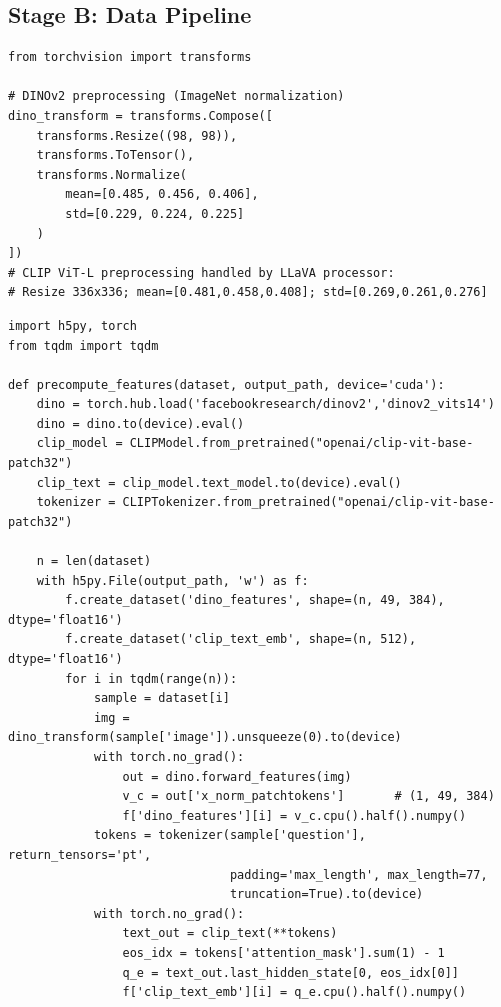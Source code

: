 \documentclass[11pt,a4paper]{article}
\begin{document}
\subsection{Stage B: Data Pipeline}

\begin{lstlisting}[caption={Separate preprocessing for DINOv2 and CLIP.}]
from torchvision import transforms

# DINOv2 preprocessing (ImageNet normalization)
dino_transform = transforms.Compose([
    transforms.Resize((98, 98)),
    transforms.ToTensor(),
    transforms.Normalize(
        mean=[0.485, 0.456, 0.406],
        std=[0.229, 0.224, 0.225]
    )
])
# CLIP ViT-L preprocessing handled by LLaVA processor:
# Resize 336x336; mean=[0.481,0.458,0.408]; std=[0.269,0.261,0.276]
\end{lstlisting}

\begin{lstlisting}[caption={Pre-compute and cache frozen encoder outputs.}]
import h5py, torch
from tqdm import tqdm

def precompute_features(dataset, output_path, device='cuda'):
    dino = torch.hub.load('facebookresearch/dinov2','dinov2_vits14')
    dino = dino.to(device).eval()
    clip_model = CLIPModel.from_pretrained("openai/clip-vit-base-patch32")
    clip_text = clip_model.text_model.to(device).eval()
    tokenizer = CLIPTokenizer.from_pretrained("openai/clip-vit-base-patch32")

    n = len(dataset)
    with h5py.File(output_path, 'w') as f:
        f.create_dataset('dino_features', shape=(n, 49, 384), dtype='float16')
        f.create_dataset('clip_text_emb', shape=(n, 512),    dtype='float16')
        for i in tqdm(range(n)):
            sample = dataset[i]
            img = dino_transform(sample['image']).unsqueeze(0).to(device)
            with torch.no_grad():
                out = dino.forward_features(img)
                v_c = out['x_norm_patchtokens']       # (1, 49, 384)
                f['dino_features'][i] = v_c.cpu().half().numpy()
            tokens = tokenizer(sample['question'], return_tensors='pt',
                               padding='max_length', max_length=77,
                               truncation=True).to(device)
            with torch.no_grad():
                text_out = clip_text(**tokens)
                eos_idx = tokens['attention_mask'].sum(1) - 1
                q_e = text_out.last_hidden_state[0, eos_idx[0]]
                f['clip_text_emb'][i] = q_e.cpu().half().numpy()
\end{lstlisting}
\end{document}
